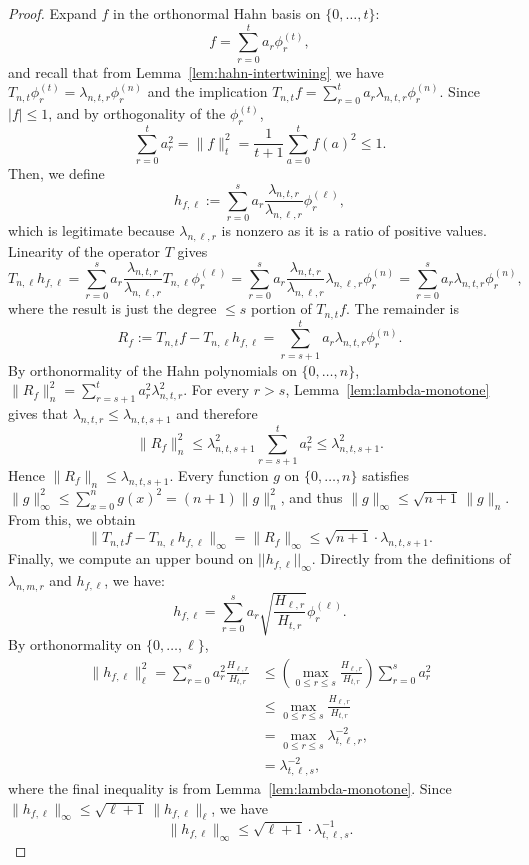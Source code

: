 \documentclass[manuscript,nonacm]{acmart}
\begin{document}
\begin{proof}
Expand \(f\) in the orthonormal Hahn basis on \(\{0,\dots,t\}\):
\[
    f
    =
    \sum_{r=0}^t a_r\phi_r^{(t)},
\]
and recall that from Lemma~\ref{lem:hahn-intertwining} we have $T_{n,t}\phi_r^{(t)}=\lambda_{n,t,r}\phi_r^{(n)}$ and the implication $T_{n,t}f=\sum_{r=0}^ta_r\lambda_{n,t,r}\phi_r^{(n)}$. 
Since \(|f|\le 1\), and by orthogonality of the $\phi_r^{(t)}$,
\[
    \sum_{r=0}^t a_r^2
    =
    \|f\|_t^2
    =
    \frac1{t+1}\sum_{a=0}^t f(a)^2
    \le 1.
\]
Then, we define
\[
    h_{f,\ell}
    :=
    \sum_{r=0}^s
    a_r
    \frac{\lambda_{n,t,r}}{\lambda_{n,\ell,r}}
    \phi_r^{(\ell)},
\]
which is legitimate because $\lambda_{n,\ell,r}$ is nonzero as it is a ratio of positive values. 
Linearity of the operator $T$ gives
\[
T_{n,\ell}h_{f,\ell}=\sum_{r=0}^sa_r\frac{\lambda_{n,t,r}}{\lambda_{n,\ell,r}}
    T_{n,\ell}\phi_r^{(\ell)}=\sum_{r=0}^sa_r
    \frac{\lambda_{n,t,r}}{\lambda_{n,\ell,r}}
    \lambda_{n,\ell,r}\phi_r^{(n)}=\sum_{r=0}^sa_r\lambda_{n,t,r}\phi_r^{(n)},
\]
where the result is just the degree $\leq s$ portion of $T_{n,t}f$.
The remainder is
\[
    R_f
    :=
    T_{n,t}f-T_{n,\ell}h_{f,\ell}
    =
    \sum_{r=s+1}^t
    a_r\lambda_{n,t,r}\phi_r^{(n)}.
\]
By orthonormality of the Hahn polynomials on \(\{0,\dots,n\}\), $\|R_f\|_n^2=\sum_{r=s+1}^ta_r^2\lambda_{n,t,r}^2$.
For every $r>s$, Lemma~\ref{lem:lambda-monotone} gives that $\lambda_{n,t,r}\leq\lambda_{n,t,s+1}$ and therefore
\[
    \|R_f\|_n^2
    \le
    \lambda^2_{n,t,s+1}
    \sum_{r=s+1}^t a_r^2
    \le
    \lambda^2_{n,t,s+1}.
\]
Hence $\|R_f\|_n\le \lambda_{n,t,s+1}$. Every function $g$ on \(\{0,\dots,n\}\) satisfies
$\|g\|_\infty^2\le\sum_{x=0}^n g(x)^2=(n+1)\|g\|_n^2$,
and thus $\|g\|_\infty\le \sqrt{n+1}\,\|g\|_n$.
From this, we obtain
\[
    \|T_{n,t}f-T_{n,\ell}h_{f,\ell}\|_\infty
    =
    \|R_f\|_\infty
    \le
    \sqrt{n+1}\cdot\lambda_{n,t,s+1}.
\]
Finally, we compute an upper bound on $||h_{f,\ell}||_{\infty}$. Directly from the definitions of $\lambda_{n,m,r}$ and $h_{f,\ell}$, we have:
\[
    h_{f,\ell}
    =
    \sum_{r=0}^s
    a_r
    \sqrt{\frac{H_{\ell,r}}{H_{t,r}}}
    \phi_r^{(\ell)}.
\]
By orthonormality on \(\{0,\dots,\ell\}\),
\[
\begin{aligned}
    \|h_{f,\ell}\|_\ell^2
    =
    \sum_{r=0}^s
    a_r^2
    \frac{H_{\ell,r}}{H_{t,r}}
    &\le
    \left(
        \max_{0\le r\le s}
        \frac{H_{\ell,r}}{H_{t,r}}
    \right)
    \sum_{r=0}^s a_r^2                                      \\
    &\le
    \max_{0\le r\le s}
    \frac{H_{\ell,r}}{H_{t,r}} \\
    &=\max_{0\le r\le s}
    \lambda^{-2}_{t,\ell,r}, \\
    &=
    \lambda^{-2}_{t,\ell,s},
\end{aligned}
\]
where the final inequality is from Lemma~\ref{lem:lambda-monotone}.
Since $\|h_{f,\ell}\|_\infty\le \sqrt{\ell+1}\,\|h_{f,\ell}\|_\ell$,
we have
\[
    \|h_{f,\ell}\|_\infty
    \le
    \sqrt{\ell+1}\cdot \lambda^{-1}_{t,\ell,s}.
\]
\end{proof}
\end{document}
